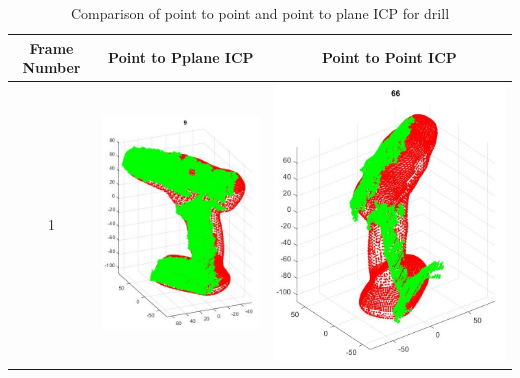 \documentclass[letterpaper, 10 pt, conference]{ieeeconf}  %
\begin{document}
\begin{table}
\centering
\caption{Comparison of point to point and point to plane ICP for drill}
\label{tab:drill}
\begin{tabular}{ccccccc}
Frame Number & \multicolumn{3}{c}{Point to Pplane ICP} & \multicolumn{3}{c}{Point to Point ICP} \\ 
\toprule
1 & \multicolumn{3}{c}{\includegraphics[scale=0.43]{d1p.jpg}} & \multicolumn{3}{c}{\includegraphics[scale=0.3]{d1o.jpg}}\\ 

\end{tabular}
\end{table}
\end{document}
